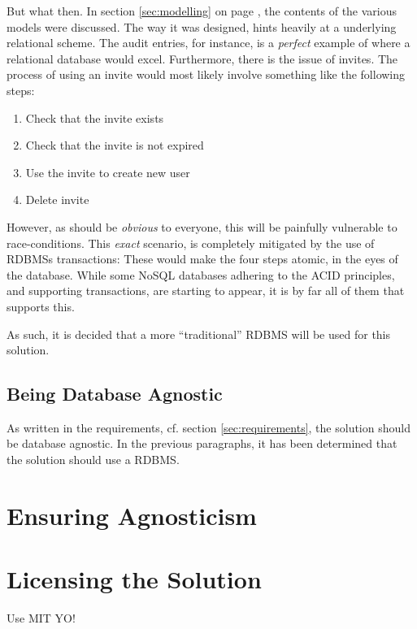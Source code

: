 		But what then. In section \ref{sec:modelling} on page \pageref{sec:modelling}, the contents of the various models were discussed. The way it was designed, hints heavily at a underlying relational scheme. The audit entries, for instance, is a \emph{perfect} example of where a relational database would excel. Furthermore, there is the issue of invites. The process of using an invite would most likely involve something like the following steps:
		\begin{enumerate}
			\item Check that the invite exists
			\item Check that the invite is not expired
			\item Use the invite to create new user
			\item Delete invite
		\end{enumerate}
		However, as should be \emph{obvious} to everyone, this will be painfully vulnerable to race-conditions. This \emph{exact} scenario, is completely mitigated by the use of RDBMSs transactions: These would make the four steps atomic, in the eyes of the database. While some NoSQL databases adhering to the ACID principles, and supporting transactions, are starting to appear\cite{no_sql_transactions}, it is by far all of them that supports this.

		As such, it is decided that a more ``traditional'' RDBMS will be used for this solution.

		\subsection{Being Database Agnostic}
			As written in the requirements, cf. section \ref{sec:requirements}, the solution should be database agnostic. In the previous paragraphs, it has been determined that the solution should use a RDBMS.

	\section{Ensuring Agnosticism}
	\section{Licensing the Solution}
		Use MIT YO!

